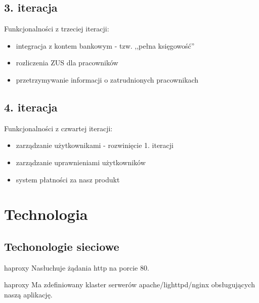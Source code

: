 \documentclass{beamer}
\begin{document}
\subsection{3. iteracja}
  \begin{frame}
      Funkcjonalności z trzeciej iteracji:
    \begin{itemize}
      \item integracja z kontem bankowym - tzw. ,,pełna księgowość'' 
      \item rozliczenia ZUS dla pracowników
      \item przetrzymywanie informacji o zatrudnionych pracownikach
    \end{itemize}
  \end{frame}
\subsection{4. iteracja}
  \begin{frame}
      Funkcjonalności z czwartej iteracji:
    \begin{itemize}
      \item zarządzanie użytkownikami - rozwinięcie 1. iteracji
      \item zarządzanie uprawnieniami użytkowników
      \item system płatności za nasz produkt
    \end{itemize}
  \end{frame}
\section{Technologia}
\subsection{Techonologie sieciowe}
  \begin{frame}
    \begin{block}{haproxy}
      Nasłuchuje żądania http na porcie 80.
    \end{block}
  \end{frame}
  \begin{frame}
    \begin{block}{haproxy}
      Ma zdefiniowany klaster serwerów apache/lighttpd/nginx obsługujących naszą aplikację.
    \end{block}
  \end{frame}
\end{document}
